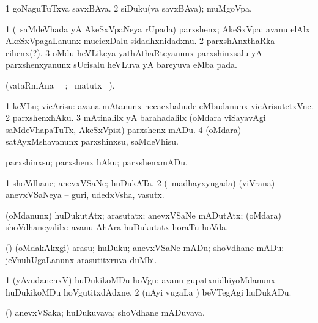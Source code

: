 \bentry
{}
\gl{\nA}
\bmng
\bnum
\num{1} goNaguTuTxva savxBAva. 
\num{2} siDuku(va savxBAva); muMgoVpa. 
\enum
\emng
\eentry

\bentry
{}
\gl{\nA}
\bmng
\bnum
\num{1} (\kanmu\ saMdeVhada yA AkeSxVpaNeya rUpada) parxshenx; AkeSxVpa:  avanu elAlx AkeSxVpagaLanunx mucicxDalu sidadhxnidadxnu. 
\num{2} parxshAnxthaRka cihenx(?). 
\num{3} oMdu heVLikeya yathAthaRteyanunx parxshinxsalu yA parxshenxyanunx sUcisalu heVLuva yA bareyuva  eMba pada. 
\enum
\emng
\eentry

\bentry
{}
\gl{\kirx}
\bmng
(vataRmAna \parxpu\ \Eva\ ; \BU\ matutx \BUkaq\ ). 
\emng

\noindent
\gl{\sakirx}
\bmng
\bnum
\num{1} keVLu; vicArisu:  avana mAtanunx necacxbahude eMbudanunx vicArisutetxVne. 
\num{2} parxshenxhAku. 
\num{3} mAtinalilx yA barahadalilx (oMdara viSayavAgi saMdeVhapaTuTx, AkeSxVpisi) parxshenx mADu. 
\num{4} (oMdara) satAyxMshavanunx parxshinxsu, saMdeVhisu. 
\enum
\emng

\noindent
\gl{\akirx}
\bmng
parxshinxsu; parxshenx hAku; parxshenxmADu. 
\emng
\eentry

\bentry
{}
\gl{\nA}
\bmng
\bnum
\num{1} shoVdhane; anevxVSaNe; huDukATa. 
\num{2} (\kanmu\ madhayxyugada) (viVrana) anevxVSaNeya -- guri, udedxVsha, vasutx. 
\enum
\emng

\noindent
\gl{\pagu}
\bmng
{} (oMdanunx) huDukutAtx; arasutatx; anevxVSaNe mADutAtx; (oMdara) shoVdhaneyalilx:  avanu AhAra huDukutatx horaTu hoVda. 
\emng
\eentry

\bentry
{}
\gl{\sakirx}
\bmng
(\kAparx) (oMdakAkxgi) arasu; huDuku; anevxVSaNe mADu; shoVdhane mADu:  jeVnuhUgaLanunx arasutitxruva duMbi. 
\emng

\noindent
\gl{\akirx}
\expl{}
\bmng
\bnum
\num{1} (yAvudanenxV) huDukikoMDu hoVgu:  avanu gupatxnidhiyoMdanunx huDukikoMDu hoVgutitxdAdxne. 
\num{2} (nAyi \mo vugaLa \vi) beVTegAgi huDukADu. 
\enum
\emng
\eentry

\bentry
{}
\gl{\nA}
\bmng
(\kAparx) anevxVSaka; huDukuvava; shoVdhane mADuvava. 
\emng
\eentry

